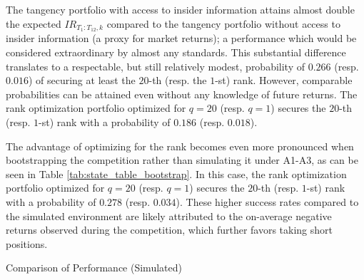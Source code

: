 \documentclass[3p,times,twocolumn]{elsarticle}
\begin{document}
The tangency portfolio with access to insider information attains almost double the expected $IR_{T_{1}:T_{12},k}$ compared to the tangency portfolio without access to insider information (a proxy for market returns); a performance which would be considered extraordinary by almost any standards.
This substantial difference translates to a respectable, but still relatively modest, probability of $0.266$ (resp. $0.016$) of securing at least the $20$-th (resp. the $1$-st) rank.
However, comparable probabilities can be attained even without any knowledge of future returns.
The rank optimization portfolio optimized for $q=20$ (resp. $q=1$) secures the $20$-th (resp. $1$-st) rank with a probability of $0.186$ (resp. $0.018$).

The advantage of optimizing for the rank becomes even more pronounced when bootstrapping the competition rather than simulating it under A1-A3, as can be seen in Table \ref{tab:state_table_bootstrap}.
In this case, the rank optimization portfolio optimized for $q=20$ (resp. $q=1$) secures the $20$-th (resp. $1$-st) rank with a probability of $0.278$ (resp. $0.034$).
These higher success rates compared to the simulated environment are likely attributed to the on-average negative returns observed during the competition, which further favors taking short positions.

\begin{table}[!htbp]
    \fontsize{5.5}{5.5}\selectfont
    \centering
    \caption{Comparison of Performance (Simulated)}
    \label{tab:state_table}
\end{table}
\end{document}
